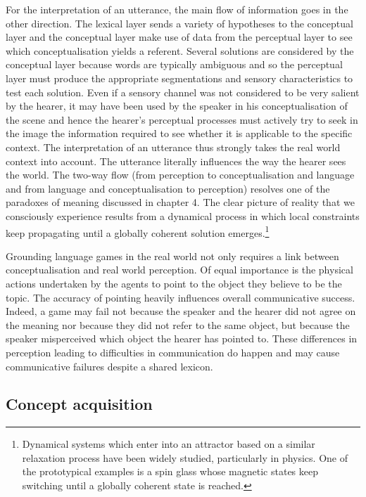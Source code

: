 For the interpretation of an utterance, the main 
flow of information goes in the other direction. The
lexical layer sends a variety of hypotheses to 
the conceptual layer and the conceptual layer make use of data 
from the perceptual layer to see which conceptualisation
yields a referent. Several solutions are considered 
by the conceptual layer because words are typically 
ambiguous and so the perceptual 
layer must produce the appropriate segmentations and 
sensory characteristics to test each solution.
Even if a sensory channel was not considered to be 
very salient by the hearer, it may have been 
used by the speaker in his conceptualisation of the 
scene and hence the hearer's perceptual 
processes must actively try to seek in the 
image the information required to see whether it 
is applicable to the specific
context. The interpretation of an utterance
thus strongly takes the real world context into account. 
The utterance literally influences the way the 
hearer sees the world. The two-way flow (from perception
to conceptualisation and language and from language
and conceptualisation to perception) resolves one of the 
paradoxes of meaning discussed in chapter 4. The 
clear picture of reality that we consciously experience
results from a dynamical process in which local constraints 
keep propagating until a globally coherent solution
emerges.\footnote{Dynamical systems which enter into an attractor
based on a similar relaxation process have been 
widely studied, particularly in physics. One of the 
prototypical examples is a spin glass whose magnetic
states keep switching until a globally coherent
state is reached.}

Grounding language games in the real world
not only requires a link between conceptualisation
and real world perception. Of equal importance is the physical
actions undertaken by the agents to point to the object they 
believe to be the topic. The accuracy of pointing
heavily influences overall communicative success. Indeed, a
game may fail not because
the speaker and the hearer did not agree on the meaning
nor because they did not refer to the same object, but because the 
speaker misperceived which object the hearer has pointed to. 
These differences in perception leading to difficulties
in communication do happen and may 
cause communicative failures despite a shared lexicon. 

\subsection{Concept acquisition}

